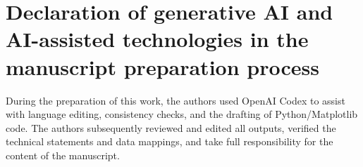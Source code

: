 \section*{Declaration of generative AI and AI-assisted technologies in the manuscript preparation process}
During the preparation of this work, the authors used OpenAI Codex to assist with language editing, consistency checks, and the drafting of Python/Matplotlib code. The authors subsequently reviewed and edited all outputs, verified the technical statements and data mappings, and take full responsibility for the content of the manuscript.
